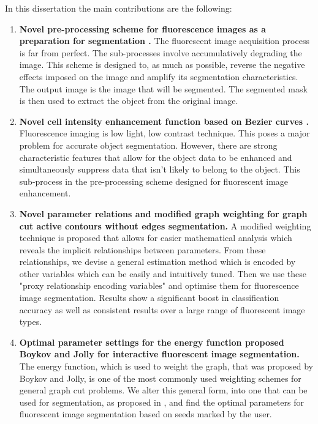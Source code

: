 In this dissertation the main contributions are the following:

\begin{enumerate}
	\item 
	\textbf{Novel pre-processing scheme for fluorescence images as a preparation for segmentation  \citep{Ryan2016}.}
	The fluorescent image acquisition process is far from perfect. The sub-processes involve accumulatively degrading the image. This scheme is designed to, as much as possible, reverse the negative effects imposed on the image and amplify its segmentation characteristics. The output image is the image that will be segmented. The segmented mask is then used to extract the object from the original image.
	
	\item
	\textbf{Novel cell intensity enhancement function based on Bezier curves \citep{Ryan2016}.}
	Fluorescence imaging is low light, low contrast technique. This poses a major problem for accurate object segmentation. However, there are strong characteristic features that allow for the object data to be enhanced and simultaneously suppress data that isn't likely to belong to the object. This sub-process in the pre-processing scheme designed for fluorescent image enhancement.
	
	\item 
	\textbf{Novel parameter relations and modified graph weighting for graph cut active contours without edges segmentation.}
	A modified weighting technique is proposed that allows for easier mathematical analysis which reveals the implicit relationships between parameters. From these relationships, we devise a general estimation method which is encoded by other variables which can be easily and intuitively tuned. Then we use these "proxy relationship encoding variables" and optimise them for fluorescence image segmentation. Results show a significant boost in classification accuracy as well as consistent results over a large range of fluorescent image types.
	
	\item
	\textbf{Optimal parameter settings for the energy function proposed Boykov and Jolly  \citep{Boykov2001_2} for interactive fluorescent image segmentation.}
	The energy function, which is used to weight the graph, that was proposed by Boykov and Jolly, is one of the most commonly used weighting schemes for general graph cut problems. We alter this general form, into one that can be used for segmentation, as proposed in \citep{Boykov2001_2}, and find the optimal parameters for fluorescent image segmentation based on seeds marked by the user.
	

\end{enumerate}
